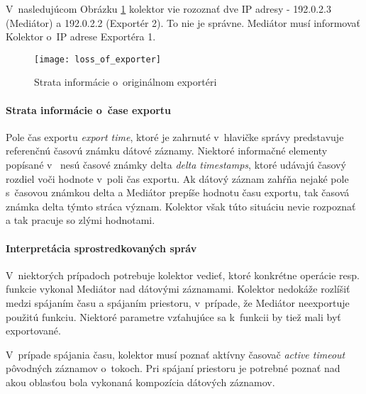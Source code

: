 V~nasledujúcom Obrázku \ref{o:loss_of_exporter} kolektor vie rozoznať dve IP adresy - 192.0.2.3 (Mediátor) 
a 192.0.2.2 (Exportér 2). To nie je správne. Mediátor musí informovať Kolektor o~IP adrese Exportéra 1.

\begin{figure}[ht!]
\centering
\texttt{[image: loss\_of\_exporter]}
\caption{Strata informácie o~originálnom exportéri}\label{o:loss_of_exporter}
\end{figure}


\paragraph{Strata informácie o~čase exportu} \label{sec:loss_time}

Pole čas exportu \emph{export time}, ktoré je zahrnuté v~hlavičke správy predstavuje referenčnú 
časovú známku dátové záznamy. Niektoré informačné elementy popísané v~\citep{rfc5102} nesú 
časové známky delta \emph{delta timestamps}, ktoré udávajú časový rozdiel voči hodnote v~poli 
čas exportu. Ak dátový záznam zahŕňa nejaké pole s~časovou známkou delta a Mediátor prepíše hodnotu 
času exportu,  tak časová známka delta týmto stráca význam. Kolektor však túto situáciu nevie 
rozpoznať a tak pracuje so zlými hodnotami.


\paragraph{Interpretácia sprostredkovaných správ}

V~niektorých prípadoch potrebuje kolektor vedieť, ktoré konkrétne operácie resp. funkcie vykonal Mediátor 
nad dátovými záznamami. Kolektor nedokáže rozlíšiť medzi spájaním času a spájaním priestoru, v~prípade, že 
Mediátor neexportuje použitú funkciu. Niektoré parametre vzťahujúce sa k~funkcii by tiež mali byť 
exportované. 

V~prípade spájania času, kolektor musí poznať aktívny časovač \emph{active timeout} 
pôvodných záznamov o~tokoch. Pri spájaní priestoru je potrebné poznať nad akou oblasťou bola 
vykonaná kompozícia dátových záznamov.\citep{rfc5982}


